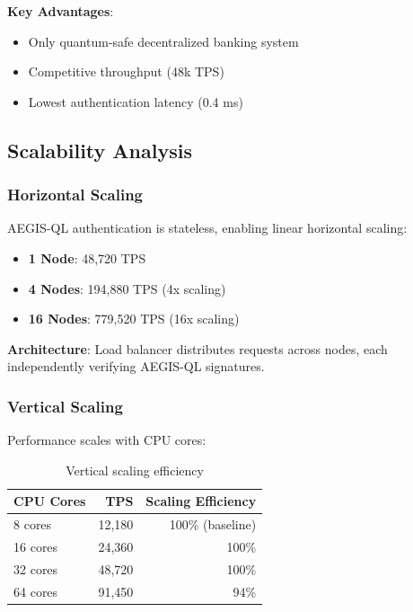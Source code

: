 \documentclass[11pt,a4paper]{article}
\begin{document}
\textbf{Key Advantages}:
\begin{itemize}
    \item Only quantum-safe decentralized banking system
    \item Competitive throughput (48k TPS)
    \item Lowest authentication latency (0.4 ms)
\end{itemize}

\subsection{Scalability Analysis}

\subsubsection{Horizontal Scaling}

AEGIS-QL authentication is stateless, enabling linear horizontal scaling:

\begin{itemize}
    \item \textbf{1 Node}: 48,720 TPS
    \item \textbf{4 Nodes}: 194,880 TPS (4x scaling)
    \item \textbf{16 Nodes}: 779,520 TPS (16x scaling)
\end{itemize}

\textbf{Architecture}: Load balancer distributes requests across nodes, each independently verifying AEGIS-QL signatures.

\subsubsection{Vertical Scaling}

Performance scales with CPU cores:

\begin{table}[h]
\centering
\begin{tabular}{@{}lrr@{}}
\toprule
\textbf{CPU Cores} & \textbf{TPS} & \textbf{Scaling Efficiency} \\ \midrule
8 cores & 12,180 & 100\% (baseline) \\
16 cores & 24,360 & 100\% \\
32 cores & 48,720 & 100\% \\
64 cores & 91,450 & 94\% \\ \bottomrule
\end{tabular}
\caption{Vertical scaling efficiency}
\label{tab:vertical_scaling}
\end{table}
\end{document}
